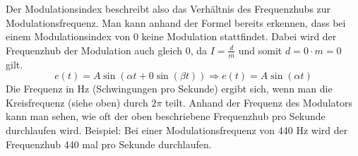 Der Modulationsindex beschreibt also das Verhältnis des Frequenzhubs zur Modulationsfrequenz.
Man kann anhand der Formel bereits erkennen, dass bei einem Modulationsindex von 0 keine Modulation stattfindet. Dabei wird der Frequenzhub der Modulation auch gleich 0, da $ I=\frac{d}{m} $ und somit $ d = 0\cdot m = 0 $ gilt. 
\[ e(t) = A \sin(\alpha t + 0 \sin(\beta t))  \Rightarrow  e(t) = A \sin(\alpha t) \]
Die Frequenz in Hz (Schwingungen pro Sekunde) ergibt sich, wenn man die Kreisfrequenz (siehe oben) durch $2\pi$ teilt.
Anhand der Frequenz des Modulators kann man sehen, wie oft der oben beschriebene Frequenzhub pro Sekunde durchlaufen wird. Beispiel: Bei einer Modulationsfrequenz von 440 Hz wird der Frequenzhub 440 mal pro Sekunde durchlaufen.
